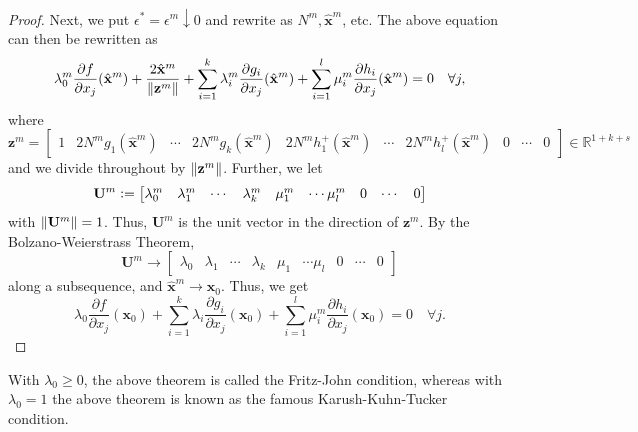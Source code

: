 \begin{proof}
    Next, we put $\epsilon^* = \epsilon^m \downarrow 0$ and rewrite as $N^m, \hat{\mathbf{x}}^m$, etc. The above equation can then be rewritten as
    \[
        \lambda_0^m \frac{\partial f}{\partial x_j}(\hat{\mathbf{x}}^m) + \frac{2\hat{\mathbf{x}}^m}{\norm{\mathbf{z}^m}} + \sum_{i=1}^k \lambda_i^m \frac{\partial g_i}{\partial x_j}(\hat{\mathbf{x}}^m) + \sum_{i=1}^l \mu_i^m \frac{\partial h_i}{\partial x_j}(\hat{\mathbf{x}}^m) = 0 \quad \forall j,
    \]
    where
    \[
        \mathbf{z}^m = \begin{bmatrix}
            1 & 2N^m g_1(\hat{\mathbf{x}}^m) & \cdots & 2N^m g_k(\hat{\mathbf{x}}^m) & 2N^m h_1^+(\hat{\mathbf{x}}^m) & \cdots & 2N^m h_l^+(\hat{\mathbf{x}}^m) & 0 & \cdots & 0
        \end{bmatrix} \in \mathbb{R}^{1+k+s}
    \]
    and we divide throughout by $\norm{\mathbf{z}^m}$. Further, we let
    \[
        \mathbf{U}^m \vcentcolon= \begin{bmatrix}
            \lambda_0^m & \lambda_1^m & \cdots & \lambda_k^m & \mu_1^m & \cdots \mu_l^m & 0 & \cdots & 0
        \end{bmatrix}
    \]
    with $\norm{\mathbf{U}^m} = 1$. Thus, $\mathbf{U}^m$ is the unit vector in the direction of $\mathbf{z}^m$. By the Bolzano-Weierstrass Theorem,
    \[
        \mathbf{U}^m \to \begin{bmatrix}
            \lambda_0 & \lambda_1 & \cdots & \lambda_k & \mu_1 & \cdots \mu_l & 0 & \cdots & 0
        \end{bmatrix}
    \]
    along a subsequence, and $\hat{\mathbf{x}}^m \to \mathbf{x}_0$. Thus, we get
    \[
        \lambda_0 \frac{\partial f}{\partial x_j}(\mathbf{x}_0) + \sum_{i=1}^k \lambda_i \frac{\partial g_i}{\partial x_j}(\mathbf{x}_0) + \sum_{i=1}^l \mu_i^m \frac{\partial h_i}{\partial x_j}(\mathbf{x}_0) = 0 \quad \forall j.
    \]
\end{proof}

With $\lambda_0 \geq 0$, the above theorem is called the Fritz-John condition, whereas with $\lambda_0 = 1$ the above theorem is known as the famous Karush-Kuhn-Tucker condition. 